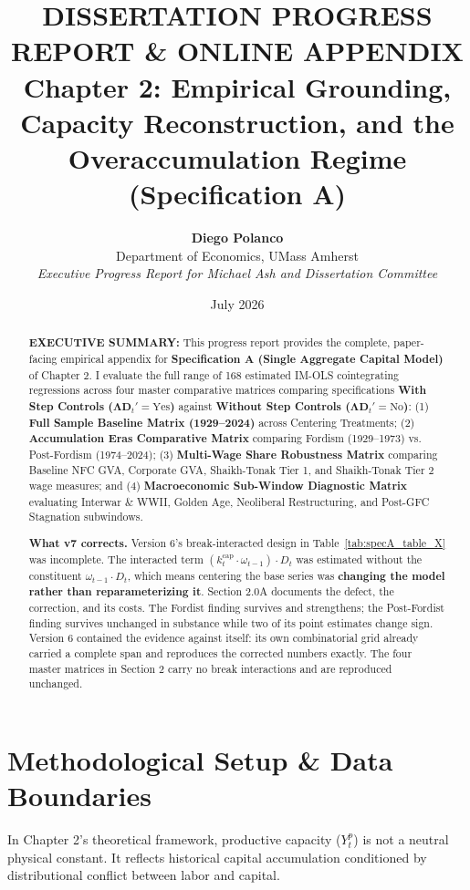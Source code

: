\documentclass[11pt,a4paper]{article}
\title{\textbf{DISSERTATION PROGRESS REPORT \& ONLINE APPENDIX} \\[0.5em] \Large \textbf{Chapter 2: Empirical Grounding, Capacity Reconstruction, and the Overaccumulation Regime (Specification A)}}
\author{\textbf{Diego Polanco} \\ Department of Economics, UMass Amherst \\ \textit{Executive Progress Report for Michael Ash and Dissertation Committee}}
\date{July 2026}
\begin{document}
\maketitle

\begin{abstract}
\noindent \textbf{EXECUTIVE SUMMARY:} This progress report provides the complete, paper-facing empirical appendix for \textbf{Specification A (Single Aggregate Capital Model)} of Chapter 2. I evaluate the full range of 168 estimated IM-OLS cointegrating regressions across four master comparative matrices comparing specifications \textbf{With Step Controls ($\boldsymbol{\Lambda}\mathbf{D}_t' = \text{Yes}$)} against \textbf{Without Step Controls ($\boldsymbol{\Lambda}\mathbf{D}_t' = \text{No}$)}: (1) \textbf{Full Sample Baseline Matrix (1929--2024)} across Centering Treatments; (2) \textbf{Accumulation Eras Comparative Matrix} comparing Fordism (1929--1973) vs. Post-Fordism (1974--2024); (3) \textbf{Multi-Wage Share Robustness Matrix} comparing Baseline NFC GVA, Corporate GVA, Shaikh-Tonak Tier 1, and Shaikh-Tonak Tier 2 wage measures; and (4) \textbf{Macroeconomic Sub-Window Diagnostic Matrix} evaluating Interwar \& WWII, Golden Age, Neoliberal Restructuring, and Post-GFC Stagnation subwindows.

\noindent \textbf{What v7 corrects.} Version 6's break-interacted design in Table~\ref{tab:specA_table_X} was incomplete. The interacted term $(k_t^{\text{cap}} \cdot \omega_{t-1}) \cdot D_t$ was estimated without the constituent $\omega_{t-1} \cdot D_t$, which means centering the base series was \textbf{changing the model rather than reparameterizing it}. Section 2.0A documents the defect, the correction, and its costs. The Fordist finding survives and strengthens; the Post-Fordist finding survives unchanged in substance while two of its point estimates change sign. Version 6 contained the evidence against itself: its own combinatorial grid already carried a complete span and reproduces the corrected numbers exactly. The four master matrices in Section 2 carry no break interactions and are reproduced unchanged.
\end{abstract}

\FloatBarrier
\section{Methodological Setup \& Data Boundaries}

In Chapter 2's theoretical framework, productive capacity ($Y^p_t$) is not a neutral physical constant. It reflects historical capital accumulation conditioned by distributional conflict between labor and capital.
\end{document}
